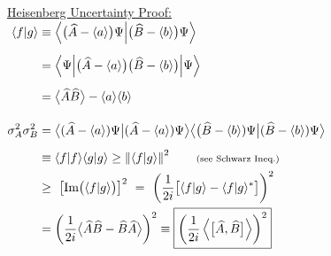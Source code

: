 \documentclass[12pt]{article}
\begin{document}
\vspace{10pt}
\noindent
\begin{minipage}[t]{0.62\textwidth}
    \underline{Heisenberg Uncertainty Proof:} \\[5pt]
    \( \begin{aligned}
        \langle f|g \rangle &\equiv 
            \Big\langle \big( \widehat{A} - \langle a \rangle \big) \Psi 
            \Big| \big( \widehat{B} - \langle b \rangle \big) \Psi \Big\rangle\\[5pt]
        &= \Big\langle \Psi \Big| \big( \widehat{A} - \langle a \rangle \big)
            \big( \widehat{B} - \langle b \rangle \big) \Big| \Psi \Big\rangle\\[5pt]
        &= \big\langle \widehat{A}\widehat{B} \big\rangle 
            - \langle a \rangle \langle b \rangle
        \\[10pt]
        \sigma_A^2 \sigma_B^2 &=
            \big\langle ( \widehat{{A}} - \langle {a} \rangle ) {\Psi} 
            \big| ( \widehat{{A}} - \langle {a} \rangle ) {\Psi} \big\rangle 
            \big\langle \big( \widehat{{B}} - \langle {b} \rangle ) {\Psi}
            \big| ( \widehat{{B}} - \langle {b} \rangle ) {\Psi} \big\rangle \\[5pt]
        &\equiv \langle f|f \rangle \langle g|g \rangle 
            \geq \left\Vert \langle f|g \rangle \right\Vert^2 
            \hspace{20pt} \text{\scriptsize(see Schwarz Ineq.)}\\
        &\geq \ \big[ \text{Im} \big( \langle f|g \rangle \big) \big]^2 \ 
            = \ \left( \frac{1}{2i} \big[ \langle f|g \rangle 
            - \langle f|g \rangle^* \big] \right)^2 \\
        &= \left( \frac{1}{2i} \big\langle \widehat{A}\widehat{B} 
            - \widehat{B}\widehat{A} \big\rangle \right)^2 
            \equiv \boxed{ \left( \frac{1}{2i} \left\langle 
            \big[ \widehat{A},\widehat{B} \big] \right\rangle \right)^2 }
    \end{aligned} \)
\end{minipage}
\end{document}
